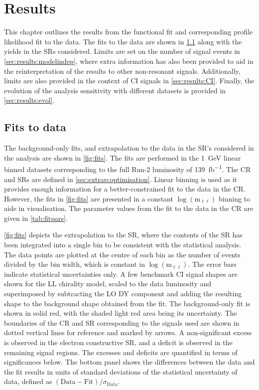 \chapter{Results}\label{chap:results}
This chapter outlines the results from the functional fit and corresponding profile likelihood fit to the data. The fits to the data are shown in \cref{sec:results:datafit} along with the yields in the SRs considered. Limits are set on the number of signal events in \cref{sec:results:modelindep}, where extra information has also been provided to aid in the reinterpretation of the results to other non-resonant signals. Additionally, limits are also provided in the context of CI signals in \cref{sec:results:CI}. Finally, the evolution of the analysis sensitivity with different datasets is provided in \cref{sec:results:evol}. 

\section{Fits to data}\label{sec:results:datafit}
The background-only fits, and extrapolation to the data in the SR's considered in the analysis are shown in \cref{fig:fits}. The fits are performed in the \SI{1}{\giga\electronvolt} linear binned datasets corresponding to the full Run-2 luminosity of \SI{139}{\femto\barn^{-1}}. The CR and SRs are defined in \cref{sec:extrap:optimisation}. Linear binning is used as it provides enough information for a better-constrained fit to the data in the CR. However, the fits in \cref{fig:fits} are presented in a constant $\log{(\text{m}_{\ell\ell})}$ binning to aide in visualisation. The parameter values from the fit to the data in the CR are given in \cref{tab:fitpars}. 

\cref{fig:fits} depicts the extrapolation to the SR, where the contents of the SR has been integrated into a single bin to be consistent with the statistical analysis. The data points are plotted at the centre of each bin as the number of events divided by the bin width, which is constant in $\log{(\text{m}_{\ell\ell})}$. The error bars indicate statistical uncertainties only. A few benchmark CI signal shapes are shown for the LL chirality model, scaled to the data luminosity and superimposed by subtracting the LO DY component and adding the resulting shape to the background shape obtained from the fit. The background-only fit is shown in solid red, with the shaded light red area being its uncertainty. The boundaries of the CR and SR corresponding to the signals used are shown in dotted vertical lines for reference and marked by arrows. A non-significant excess is observed in the electron constructive SR, and a deficit is observed in the remaining signal regions. The excesses and deficits are quantified in terms of significances below. The bottom panel shows the differences between the data and the fit results in units of standard deviations of the statistical uncertainty of data, defined as $(\mathrm{Data}-\mathrm{Fit})/\sigma_\mathrm{Data}$. 

